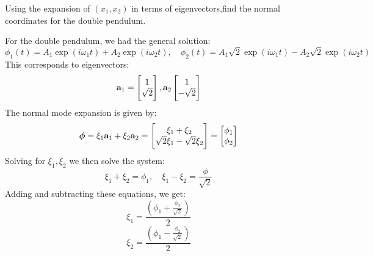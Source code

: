 \begin{p}
Using the expansion of $(x_1, x_2)$ in terms of eigenvectors,find the normal coordinates for the double pendulum.
\end{p}
\begin{s}
For the double pendulum, we had the general solution:
\[\phi_1(t) = A_1\exp(i\omega_1 t) + A_2\exp(i\omega_2 t), \quad \phi_2(t) = A_1\sqrt{2}\exp(i\omega_1 t) - A_2\sqrt{2}\exp(i\omega_2 t)\]
This corresponds to eigenvectors:
\[\mathbf{a}_1 = \begin{bmatrix}1 \\ \sqrt{2}\end{bmatrix}, \mathbf{a}_2 \begin{bmatrix}1 \\ -\sqrt{2}\end{bmatrix}\]
The normal mode expansion is given by:
\[\bm{\phi} = \xi_1\mathbf{a}_1 + \xi_2\mathbf{a}_2 = \begin{bmatrix}\xi_1 + \xi_2 \\ \sqrt{2}\xi_1 - \sqrt{2}\xi_2\end{bmatrix} = \begin{bmatrix}\phi_1 \\ \phi_2\end{bmatrix}\]
Solving for $\xi_1, \xi_2$ we then solve the system:
\[\xi_1 + \xi_2 = \phi_1, \quad \xi_1 - \xi_2 = \frac{\phi}{\sqrt{2}}\]
Adding and subtracting these equations, we get:
\[\xi_1 = \frac{\left(\phi_1 + \frac{\phi_2}{\sqrt{2}}\right)}{2}\]
\[\xi_2 = \frac{\left(\phi_1 - \frac{\phi_2}{\sqrt{2}}\right)}{2}\]

\end{s}